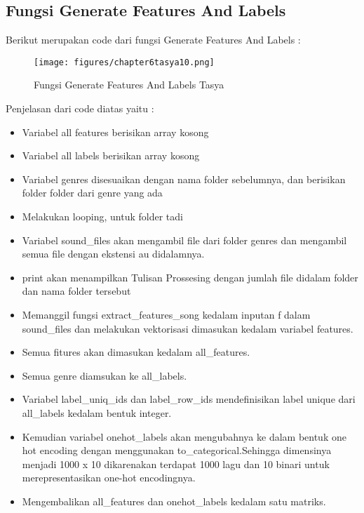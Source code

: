 \subsection{Fungsi Generate Features And Labels}
Berikut merupakan code dari fungsi Generate Features And Labels :
\begin{figure}[ht]
\centering
\texttt{[image: figures/chapter6tasya10.png]}
\caption{Fungsi Generate Features And Labels Tasya}
\label{Praktek}
\end{figure}
Penjelasan dari code diatas yaitu :
\begin{itemize}
\item Variabel all features berisikan array kosong
\item Variabel all labels berisikan array kosong
\item Variabel genres disesuaikan dengan nama folder sebelumnya, dan berisikan folder folder dari genre yang ada
\item Melakukan looping, untuk folder tadi
\item Variabel sound\_files akan mengambil file dari folder genres dan mengambil semua file dengan ekstensi au didalamnya.
\item print akan menampilkan Tulisan Prossesing dengan jumlah file didalam folder dan nama folder tersebut
\item Memanggil fungsi extract\_features\_song kedalam inputan f dalam sound\_files dan melakukan vektorisasi dimasukan kedalam variabel features.
\item Semua fitures akan dimasukan kedalam all\_features.
\item Semua genre diamsukan ke all\_labels.
\item Variabel label\_uniq\_ids dan label\_row\_ids mendefinisikan label unique dari all\_labels kedalam bentuk integer.
\item Kemudian variabel onehot\_labels akan mengubahnya ke dalam bentuk one hot encoding dengan menggunakan to\_categorical.Sehingga dimensinya menjadi 1000 x 10 dikarenakan terdapat 1000 lagu dan 10 binari untuk merepresentasikan one-hot encodingnya.
\item Mengembalikan all\_features dan onehot\_labels kedalam satu matriks.
\end{itemize}

